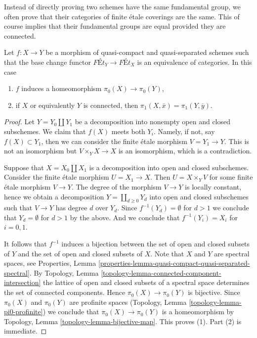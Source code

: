 \medskip\noindent
Instead of directly proving two schemes have the same fundamental
group, we often prove that their categories of finite \'etale
coverings are the same. This of course implies that
their fundamental groups are equal provided they are connected.

\begin{lemma}
\label{lemma-what-equivalence-gives}
Let $f : X \to Y$ be a morphism of quasi-compact and quasi-separated schemes
such that the base change functor $\textit{F\'Et}_Y \to \textit{F\'Et}_X$
is an equivalence of categories. In this case
\begin{enumerate}
\item $f$ induces a homeomorphism $\pi_0(X) \to \pi_0(Y)$,
\item if $X$ or equivalently $Y$ is connected, then
$\pi_1(X, \overline{x}) = \pi_1(Y, \overline{y})$.
\end{enumerate}
\end{lemma}

\begin{proof}
Let $Y = Y_0 \amalg Y_1$ be a decomposition into nonempty open and closed
subschemes. We claim that $f(X)$ meets both $Y_i$. Namely, if not,
say $f(X) \subset Y_1$, then we can consider the finite \'etale
morphism $V = Y_1 \to Y$. This is not an
isomorphism but $V \times_Y X \to X$ is an isomorphism, which is
a contradiction.

\medskip\noindent
Suppose that $X = X_0 \amalg X_1$ is a decomposition into open and closed
subschemes. Consider the finite \'etale morphism $U = X_1 \to X$. Then
$U = X \times_Y V$ for some finite \'etale morphism $V \to Y$. The degree
of the morphism $V \to Y$ is locally constant, hence we obtain a decomposition
$Y = \coprod_{d \geq 0} Y_d$ into open and closed subschemes
such that $V \to Y$ has degree $d$ over $Y_d$. Since
$f^{-1}(Y_d) = \emptyset$ for $d > 1$ we conclude that $Y_d = \emptyset$
for $d > 1$ by the above. And we conclude that $f^{-1}(Y_i) = X_i$
for $i = 0, 1$.

\medskip\noindent
It follows that $f^{-1}$ induces a bijection between the set of
open and closed subsets of $Y$ and the set of open and closed subsets of $X$.
Note that $X$ and $Y$ are spectral spaces, see Properties, Lemma
\ref{properties-lemma-quasi-compact-quasi-separated-spectral}.
By Topology, Lemma \ref{topology-lemma-connected-component-intersection}
the lattice of open and closed subsets of a spectral space
determines the set of connected components.
Hence $\pi_0(X) \to \pi_0(Y)$ is bijective. Since $\pi_0(X)$ and
$\pi_0(Y)$ are profinite spaces
(Topology, Lemma \ref{topology-lemma-pi0-profinite})
we conclude that $\pi_0(X) \to \pi_0(Y)$ is a homeomorphism by
Topology, Lemma \ref{topology-lemma-bijective-map}. This proves (1).
Part (2) is immediate.
\end{proof}

